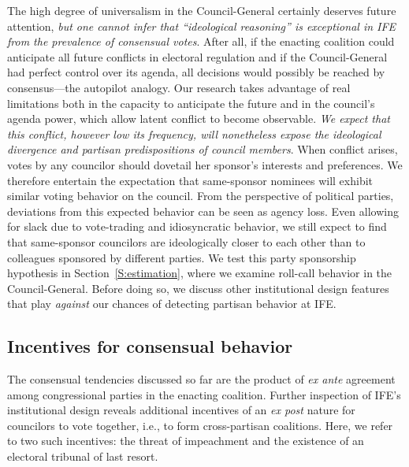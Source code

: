 \documentclass[12 pt, letter]{article}
\begin{document}
The high degree of universalism in the Council-General certainly deserves future attention, \emph{but one cannot infer that ``ideological reasoning'' is exceptional in IFE from the prevalence of consensual votes}.  After all, if the enacting coalition could anticipate all future conflicts in electoral regulation and if the Council-General had perfect control over its agenda, all decisions would possibly be reached by consensus---the autopilot analogy.  Our research takes advantage of real limitations both in the capacity to anticipate the future and in the council's agenda power, which allow latent conflict to become observable.  \emph{We expect that this conflict, however low its frequency, will nonetheless expose the ideological divergence and partisan predispositions of council members}.  When conflict arises, votes by any councilor should dovetail her sponsor's interests and preferences.
We therefore entertain the expectation that same-sponsor nominees will exhibit similar voting behavior on the council. From the perspective of political parties, deviations from this expected behavior can be seen as agency loss.  Even allowing for slack due to vote-trading and idiosyncratic behavior, we still expect to find that same-sponsor councilors are ideologically closer to each other than to colleagues sponsored by different parties.  We test this party sponsorship hypothesis in Section~\ref{S:estimation}, where we examine roll-call behavior in the Council-General.  Before doing so, we discuss other institutional design features that play \emph{against} our chances of detecting partisan behavior at IFE.

\subsection{Incentives for consensual behavior}
The consensual tendencies discussed so far are the product of \emph{ex ante} agreement among congressional parties in the enacting coalition.  Further inspection of IFE's institutional design reveals additional incentives of an \emph{ex post} nature for councilors to vote together, i.e., to form cross-partisan coalitions.  Here, we refer to two such incentives: the threat of impeachment and the existence of an electoral tribunal of last resort.
\end{document}
